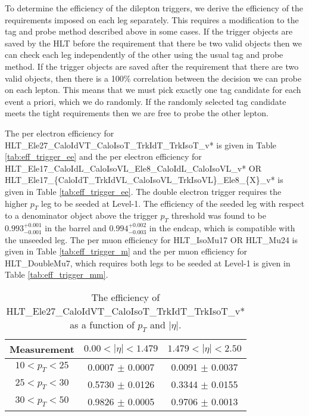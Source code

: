  
To determine the efficiency of the dilepton triggers, 
we derive the efficiency of the requirements imposed on each leg separately.
This requires a modification to the tag and probe method described above in some cases.
If the trigger objects are saved by the HLT before the requirement that there be two valid objects then
we can check each leg independently of the other using the usual tag and probe method.
If the trigger objects are saved after the requirement that there are two valid objects, then there is 
a 100\% correlation between the decision we can probe on each lepton.
This means that we must pick exactly one tag candidate for each event a priori, which we do 
randomly. 
If the randomly selected tag candidate meets the tight requirements then we are free to 
probe the other lepton.

The per electron efficiency for
HLT\_Ele27\_CaloIdVT\_CaloIsoT\_TrkIdT\_TrkIsoT\_v*
is given in Table \ref{tab:eff_trigger_ee}
and the per electron efficiency for 
HLT\_Ele17\_CaloIdL\_CaloIsoVL\_Ele8\_CaloIdL\_CaloIsoVL\_v* OR
HLT\_Ele17\_\{CaloIdT\_TrkIdVL\_CaloIsoVL\_TrkIsoVL\}\_Ele8\_\{X\}\_v*
is given in Table \ref{tab:eff_trigger_ee}.
The double electron trigger requires the higher $p_T$ leg to be seeded at Level-1.
The efficiency of the seeded leg with respect to a denominator object above the
trigger $p_T$ threshold was found to be $0.993^{+0.001}_{-0.001}$ in the barrel and
$0.994^{+0.002}_{-0.003}$ in the endcap, which is compatible with the unseeded leg.
The per muon efficiency for
HLT\_IsoMu17 OR HLT\_Mu24
is given in Table \ref{tab:eff_trigger_m}
and the per muon efficiency for HLT\_DoubleMu7, which requires both legs to be seeded
at Level-1 is
given in Table \ref{tab:eff_trigger_mm}.
\vspace{10pt}
\begin{table}[!ht]
\begin{center}
\begin{tabular}{c|c|c}
\hline
Measurement  & $0.00<|\eta|<1.479$  & $1.479<|\eta|<2.50$  \\ 
\hline
$  10<p_T<  25$ & 0.0007 $\pm$ 0.0007  & 0.0091 $\pm$ 0.0037  \\ \hline 
$  25<p_T<  30$ & 0.5730 $\pm$ 0.0126  & 0.3344 $\pm$ 0.0155  \\ \hline 
$  30<p_T<  50$ & 0.9826 $\pm$ 0.0005  & 0.9706 $\pm$ 0.0013  \\ \hline 
\end{tabular}
\caption{The efficiency of HLT\_Ele27\_CaloIdVT\_CaloIsoT\_TrkIdT\_TrkIsoT\_v* as a function of $p_T$ and $|\eta|$.}
\label{tab:eff_trigger_e}
\end{center}
\end{table}
